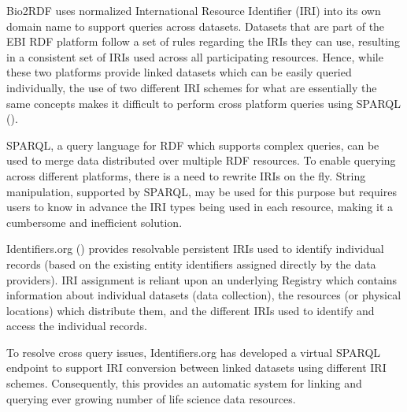 \documentclass{bioinfo}
\begin{document}
Bio2RDF uses normalized International Resource Identifier (IRI) into its own domain name to support queries across datasets.
Datasets that are part of the EBI RDF platform follow a set of rules regarding the IRIs they can use, resulting in a consistent set of IRIs used across all participating resources. Hence, while these two platforms provide linked datasets which can be easily queried individually, the use of two different IRI schemes for what are essentially the same concepts makes it difficult to perform cross platform queries using SPARQL (\cite{Prud'hommeaux2008}).  

SPARQL, a query language for RDF which supports complex queries, can be used to merge data distributed over multiple RDF resources. To enable querying across different platforms, there is a need to rewrite IRIs on the fly. 
String manipulation, supported by SPARQL, may be used for this purpose but requires users to know in advance the IRI types being used in each resource, making it a cumbersome and inefficient solution. 

Identifiers.org (\cite{Juty01012012}) provides resolvable persistent IRIs used to identify individual records (based on the existing entity identifiers assigned directly by the data providers). IRI assignment is reliant upon an underlying Registry which contains information about individual datasets (data collection), the resources (or physical locations) which distribute them, and the different IRIs used to identify and access the individual records.

To resolve cross query issues, Identifiers.org has developed a virtual SPARQL endpoint to support IRI conversion between linked datasets using different IRI schemes. Consequently, this provides an automatic system for linking and querying ever growing number of life science data resources.
\end{document}
